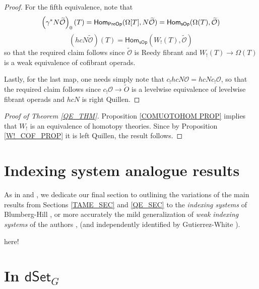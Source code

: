 \documentclass[a4paper,10pt
,draft
]{article}%
\renewcommand{\1}{\eta}%
\begin{document}
\begin{proof}
For the fifth equivalence, note that
\[
\left(\gamma^{\**} N \widetilde{\mathcal{O}}\right)_0(T) = 
\mathsf{Hom}_{\mathsf{PreOp}}(\Omega[T], N \widetilde{\mathcal{O}}) =
\mathsf{Hom}_{\mathsf{sOp}}(\Omega(T),  \widetilde{\mathcal{O}})
\]
\[
\left(hcN \widetilde{\mathcal{O}} \right)(T) = 
\mathsf{Hom}_{\mathsf{sOp}}(W_!(T),  \widetilde{\mathcal{O}})
\]
so that the required claim follows since 
$\widetilde{\mathcal{O}}$ is Reedy fibrant and
$W_!(T) \to \Omega(T)$ is a weak equivalence of cofibrant operads.

Lastly, for the last map, one needs simply note that
$c_! hcN \mathcal{O} = hcN c_! \mathcal{O}$, so that the required claim follows since 
$c_! \mathcal{O} \to \widetilde{O}$
is a levelwise equivalence of levelwise fibrant operads
and $hcN$ is right Quillen.
\end{proof}

\begin{proof}
      [Proof of Theorem \ref{QE_THM}]
      Proposition \ref{COMUOTOHOM PROP} implies that $W_!$ is an equivalence of homotopy theories.
      Since by Proposition \ref{W!_COF_PROP} it is left Quillen,
      the result follows.
\end{proof}


\section{Indexing system analogue results}

As in \cite[\S 6]{BP_edss} and \cite[\S 9]{Per_eds}, we dedicate our final section to 
outlining the variations of the main results from Sections \ref{TAME_SEC} and \ref{QE_SEC} to
the \textit{indexing systems} of Blumberg-Hill \cite{BH15}, or more accurately
the mild generalization of \textit{weak indexing systems} of the authors \cite[\S 9]{Per_eds}, \cite[\S4.4]{BP_geo} (and independently identified by Gutierrez-White \cite{GW}).

here!





\newpage

\section{In $\mathsf{dSet}_G$}
\end{document}

